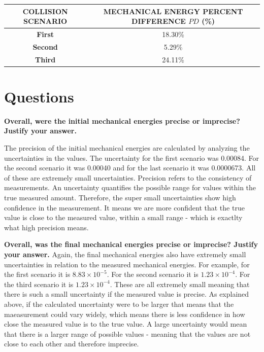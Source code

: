 \documentclass{article}
\begin{document}
\begin{table}[h!]
\centering
\begin{tabular}{|c|c|}
\hline
\textbf{COLLISION SCENARIO} & \textbf{MECHANICAL ENERGY PERCENT DIFFERENCE $PD$ (\%)} \\ \hline
\textbf{First} & 18.30\% \\ \hline
\textbf{Second} & 5.29\% \\ \hline
\textbf{Third} & 24.11\% \\ \hline
\end{tabular}
\end{table}
\section{Questions}


\parindent
\textbf{Overall, were the initial mechanical energies precise or imprecise? Justify your answer.} \vspace{0.25cm}
\par
\newline
The precision of the initial mechanical energies are calculated by analyzing the uncertainties in the values. The uncertainty for the first scenario was 0.00084. For the second scenario it was 0.00040 and for the last scenario it was 0.0000673. All of these are extremely small uncertainties. 
Precision refers to the consistency of measurements. An uncertainty quantifies the possible range for values within the true measured amount. Therefore, the super small uncertainties show high confidence in the measurement. It means we are more confident that the true value is close to the measured value, within a small range - which is exactlty what high precision means. \vspace{0.5cm}



\textbf{Overall, was the final mechanical energies precise or imprecise? Justify your answer.}\vspace{0.25cm}
\newline
Again, the final mechanical energies also have extremely small uncertainties in relation to the measured mechanical energies. For example, for the first scenario it is $8.83 \times 10^{-5}$. For the second scenario it is $1.23 \times 10^{-4}$. For the third scenario it is $1.23 \times 10^{-4}$. These are all extremely small meaning that there is such a small uncertainty if the measured value is precise. As explained above, if the calculated uncertainty were to be larger that means that the maeasurement could vary widely, which means there is less confidence in how close the measured value is to the true value. A large uncertainty would mean that there is a larger range of possible values - meaning that the values are not close to each other and therefore imprecise. \vspace{0.5cm}
\end{document}
